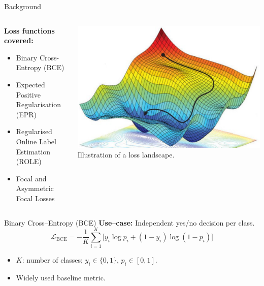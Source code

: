\begin{frame}{Background}
  \begin{columns}
    \begin{column}{0.55\textwidth}
      \textbf{Loss functions covered:}
          \begin{itemize}
            \item Binary Cross-Entropy (BCE)
            \item Expected Positive Regularisation (EPR)
            \item Regularised Online Label Estimation (ROLE)
            \item Focal and Asymmetric Focal Losses
          \end{itemize}
    \end{column}

    \begin{column}{0.45\textwidth}
      \centering
      \includegraphics[width=0.9\linewidth]{Images/loss_optimization.png}\\
      \scriptsize Illustration of a loss landscape.
    \end{column}
  \end{columns}
\end{frame}


\begin{frame}{Binary Cross--Entropy (BCE)}
\textbf{Use--case:} Independent yes/no decision per class.\\[0.4em]
\begin{equation*}
\mathcal{L}_{\text{BCE}} = -\frac{1}{K}\sum_{i=1}^{K}\bigl[y_i\log p_i + (1-y_i)\log(1-p_i)\bigr]
\end{equation*}
\begin{itemize}
  \item $K$: number of classes; $y_i\in\{0,1\}$, $p_i\in[0,1]$.
  \item Widely used baseline metric.
\end{itemize}
\end{frame}

